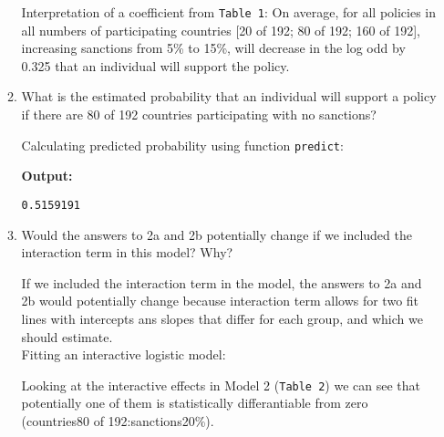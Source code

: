 \documentclass[12pt,letterpaper]{article}
\begin{document}
\begin{enumerate}
\begin{enumerate}
	\vspace{.5cm}
	\noindent Interpretation of a coefficient from \texttt{Table 1}:  On average, for all policies in all numbers of participating countries [20 of 192; 80 of 192; 160 of 192], increasing sanctions from 5\% to 15\%, will decrease in the log odd by 0.325 that an individual will support the policy.
		
		\item
		What is the estimated probability that an individual will support a policy if there are 80 of 192 countries participating with no sanctions? 
	
	\vspace{.5cm}
	\noindent Calculating predicted probability using function \texttt{predict}:
	 
	
		\vspace{.5cm}
		\noindent \textbf{Output:}
	\begin{lstlisting}
0.5159191
	\end{lstlisting}
		
		\item
		Would the answers to 2a and 2b potentially change if we included the interaction term in this model? Why? 
		
		\vspace{.5cm}
		\noindent If we included the interaction term in the model, the answers to 2a and 2b would potentially change because interaction term allows for two fit lines with intercepts ans slopes that differ for each group, and which we should estimate. \\ Fitting an interactive logistic model:
			 


	\noindent Looking at the interactive effects in Model 2 (\texttt{Table 2}) we can see that potentially one of them is statistically differantiable from zero (countries80 of 192:sanctions20\%). 


\end{enumerate}
\end{enumerate}
\end{document}

